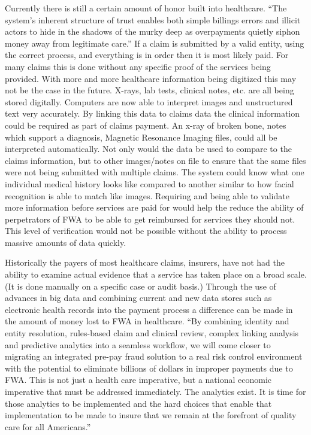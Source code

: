 \documentclass[sigconf]{acmart}
\begin{document}
Currently there is still a certain amount of honor built into healthcare.  ``The system's 
inherent structure of trust enables both simple billings errors and illicit actors to hide 
in the shadows of the murky deep as overpayments quietly siphon money away from legitimate 
care.''\cite{RevCycle}  If a claim is submitted by a valid entity, using the correct process, 
and everything is in order then it is most likely paid.  For many claims this is done 
without any specific proof of the services being provided.  With more and more healthcare 
information being digitized this may not be the case in the future.  X-rays, lab tests, 
clinical notes, etc. are all being stored digitally.  Computers are now able to interpret 
images and unstructured text very accurately.  By linking this data to claims data the clinical 
information could be required as part of claims payment.  An x-ray of broken bone, notes which 
support a diagnosis, Magnetic Resonance Imaging files, could all be interpreted automatically.  
Not only would the data be used to compare to the claims information, but to other images/notes 
on file to ensure that the same files were not being submitted with multiple claims.  The system 
could know what one individual medical history looks like compared to another similar to how 
facial recognition is able to match like images.  Requiring and being able to validate more 
information before services are paid for would help the reduce the ability of perpetrators of FWA 
to be able to get reimbursed for services they should not.  This level of verification would not 
be possible without the ability to process massive amounts of data quickly.  


Historically the payers of most healthcare claims, insurers, have not had the 
ability to examine actual evidence that a service has taken place on a broad scale.  (It is done 
manually on a specific case or audit basis.)  Through the use of advances in big data and combining 
current and new data stores such as electronic health records into the payment process a difference 
can be made in the amount of money lost to FWA in healthcare.  ``By combining identity and entity resolution, 
rules-based claim and clinical review, complex linking analysis and predictive analytics into a 
seamless workflow, we will come closer to migrating an integrated pre-pay fraud solution to a real 
risk control environment with the potential to eliminate billions of dollars in improper payments due 
to FWA. This is not just a health care imperative, but a national economic imperative that must be 
addressed immediately. The analytics exist. It is time for those analytics to be implemented and the 
hard choices that enable that implementation to be made to insure that we remain at the forefront of 
quality care for all Americans.''\cite{LexisNexis}
\end{document}
